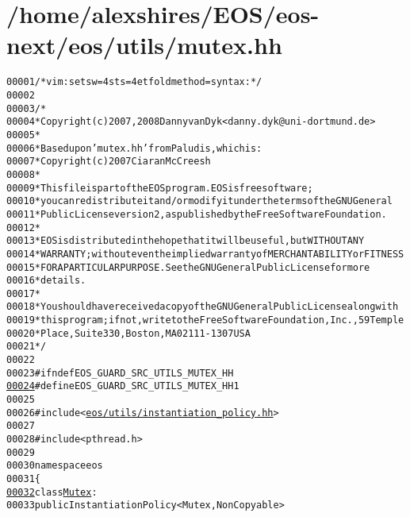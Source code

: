 \hypertarget{mutex_8hh_source}{
\section{/home/alexshires/EOS/eos-\/next/eos/utils/mutex.hh}
}


\begin{footnotesize}\begin{alltt}
00001 \textcolor{comment}{/* vim: set sw=4 sts=4 et foldmethod=syntax : */}
00002 
00003 \textcolor{comment}{/*}
00004 \textcolor{comment}{ * Copyright (c) 2007, 2008 Danny van Dyk <danny.dyk@uni-dortmund.de>}
00005 \textcolor{comment}{ *}
00006 \textcolor{comment}{ * Based upon 'mutex.hh' from Paludis, which is:}
00007 \textcolor{comment}{ *     Copyright (c) 2007 Ciaran McCreesh}
00008 \textcolor{comment}{ *}
00009 \textcolor{comment}{ * This file is part of the EOS program. EOS is free software;}
00010 \textcolor{comment}{ * you can redistribute it and/or modify it under the terms of the GNU General}
00011 \textcolor{comment}{ * Public License version 2, as published by the Free Software Foundation.}
00012 \textcolor{comment}{ *}
00013 \textcolor{comment}{ * EOS is distributed in the hope that it will be useful, but WITHOUT ANY}
00014 \textcolor{comment}{ * WARRANTY; without even the implied warranty of MERCHANTABILITY or FITNESS}
00015 \textcolor{comment}{ * FOR A PARTICULAR PURPOSE.  See the GNU General Public License for more}
00016 \textcolor{comment}{ * details.}
00017 \textcolor{comment}{ *}
00018 \textcolor{comment}{ * You should have received a copy of the GNU General Public License along with}
00019 \textcolor{comment}{ * this program; if not, write to the Free Software Foundation, Inc., 59 Temple}
00020 \textcolor{comment}{ * Place, Suite 330, Boston, MA  02111-1307  USA}
00021 \textcolor{comment}{ */}
00022 
00023 \textcolor{preprocessor}{#ifndef EOS\_GUARD\_SRC\_UTILS\_MUTEX\_HH}
\hypertarget{mutex_8hh_source_l00024}{}\hyperlink{mutex_8hh_a79f0d7f86442f8f490dec37851f8a27e}{00024} \textcolor{preprocessor}{}\textcolor{preprocessor}{#define EOS\_GUARD\_SRC\_UTILS\_MUTEX\_HH 1}
00025 \textcolor{preprocessor}{}
00026 \textcolor{preprocessor}{#include <\hyperlink{instantiation__policy_8hh}{eos/utils/instantiation_policy.hh}>}
00027 
00028 \textcolor{preprocessor}{#include <pthread.h>}
00029 
00030 \textcolor{keyword}{namespace }eos
00031 \{
\hypertarget{mutex_8hh_source_l00032}{}\hyperlink{classeos_1_1Mutex}{00032}     \textcolor{keyword}{class }\hyperlink{classeos_1_1Mutex}{Mutex} :
00033         \textcolor{keyword}{public} InstantiationPolicy<Mutex, NonCopyable>

\end{alltt}
\end{footnotesize}
